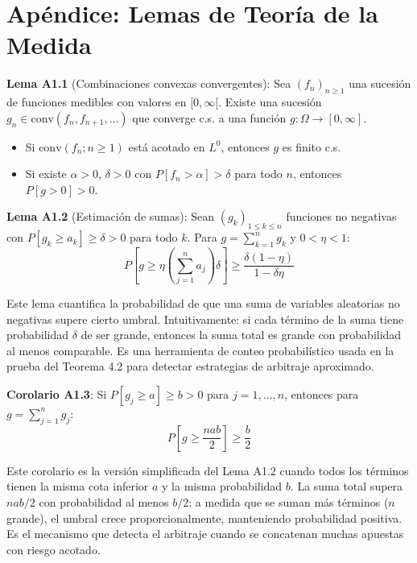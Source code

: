 \documentclass[12pt]{article}
\begin{document}
\section{Ap\'endice: Lemas de Teor\'ia de la Medida}

\textbf{Lema A1.1} (Combinaciones convexas convergentes): Sea $(f_n)_{n \geq 1}$ una sucesi\'on de funciones medibles con valores en $[0, \infty[$. Existe una sucesi\'on $g_n \in \text{conv}(f_n, f_{n+1}, \ldots)$ que converge c.s. a una funci\'on $g : \Omega \to [0, \infty]$.
\begin{itemize}
    \item Si $\text{conv}(f_n; n \geq 1)$ est\'a acotado en $L^0$, entonces $g$ es finito c.s.
    \item Si existe $\alpha > 0$, $\delta > 0$ con $P[f_n > \alpha] > \delta$ para todo $n$, entonces $P[g > 0] > 0$.
\end{itemize}

\textbf{Lema A1.2} (Estimaci\'on de sumas): Sean $(g_k)_{1 \leq k \leq n}$ funciones no negativas con $P[g_k \geq a_k] \geq \delta > 0$ para todo $k$. Para $g = \sum_{k=1}^n g_k$ y $0 < \eta < 1$:
\begin{equation}
    P\left[g \geq \eta \left(\sum_{j=1}^n a_j\right) \delta\right] \geq \frac{\delta(1-\eta)}{1-\delta\eta}
\end{equation}

\begin{intuicionmat}
Este lema cuantifica la probabilidad de que una suma de variables aleatorias no negativas supere cierto umbral. Intuitivamente: si cada t\'ermino de la suma tiene probabilidad $\delta$ de ser grande, entonces la suma total es grande con probabilidad al menos comparable. Es una herramienta de conteo probabil\'istico usada en la prueba del Teorema 4.2 para detectar estrategias de arbitraje aproximado.
\end{intuicionmat}

\textbf{Corolario A1.3}: Si $P[g_j \geq a] \geq b > 0$ para $j = 1, \ldots, n$, entonces para $g = \sum_{j=1}^n g_j$:
\begin{equation}
    P\left[g \geq \frac{nab}{2}\right] \geq \frac{b}{2}
\end{equation}

\begin{intuicionmat}
Este corolario es la versi\'on simplificada del Lema A1.2 cuando todos los t\'erminos tienen la misma cota inferior $a$ y la misma probabilidad $b$. La suma total supera $nab/2$ con probabilidad al menos $b/2$: a medida que se suman m\'as t\'erminos ($n$ grande), el umbral crece proporcionalmente, manteniendo probabilidad positiva. Es el mecanismo que detecta el arbitraje cuando se concatenan muchas apuestas con riesgo acotado.
\end{intuicionmat}
\end{document}
